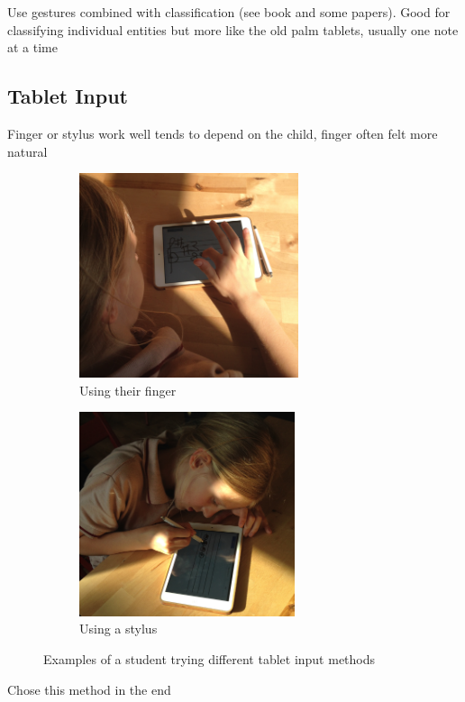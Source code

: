 Use gestures combined with classification (see book and some papers).
Good for classifying individual entities but more like the old palm tablets, usually one note at a time

\subsection{Tablet Input}

Finger or stylus work well tends to depend on the child, finger often felt more natural

\begin{figure}[h!]
    \centering
    \begin{subfigure}[b]{.4\linewidth}
        \centering
        \includegraphics[height=6cm]{gfx/photos/user-finger.jpg}
        \caption{Using their finger}
    \end{subfigure}
    \begin{subfigure}[b]{.4\linewidth}
        \centering
        \includegraphics[height=6cm]{gfx/photos/user-stylus.jpg}
        \caption{Using a stylus}
    \end{subfigure}

    \caption{Examples of a student trying different tablet input methods}
\end{figure}

Chose this method in the end
